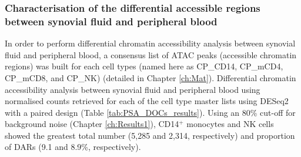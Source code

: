 


\subsubsection{Characterisation of the differential accessible regions between synovial fluid and peripheral blood}

In order to perform differential chromatin accessibility analysis between synovial fluid and peripheral blood, a consensus list of ATAC peaks (accessible chromatin regions) was built for each cell types (named here as CP\_CD14, CP\_mCD4, CP\_mCD8, and CP\_NK) (detailed in Chapter \ref{ch:Mat}). %
 Differential chromatin accessibility analysis between synovial fluid and peripheral blood using normalised counts retrieved for each of the cell type master lists using DESeq2 with a paired design (Table \ref{tab:PSA_DOCs_results}). Using an 80\% cut-off for background noise (Chapter \ref{ch:Results1}), %
CD14$^+$ monocytes and NK cells showed the greatest total number (5,285 and 2,314, respectively) and proportion of DARs (9.1 and 8.9\%, respectively). 



